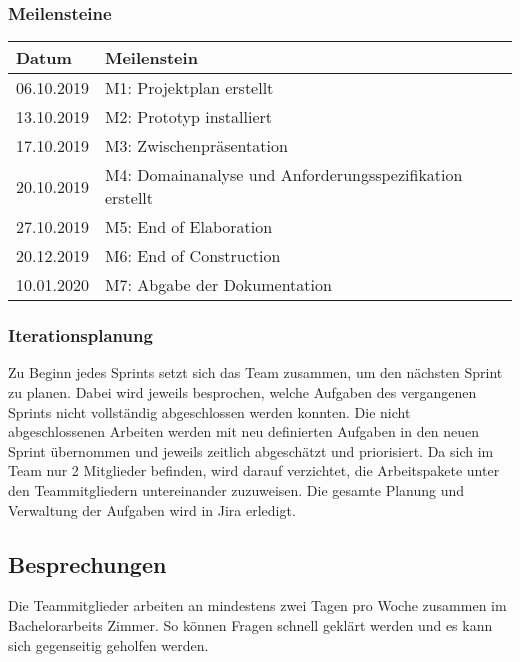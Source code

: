 \subsubsection{Meilensteine}
\begin{center}
	\begin{tabular}{| m{3cm} | m{9cm}|}
	\hline
	\textbf{Datum} & \textbf{Meilenstein} \\
	\hline
	06.10.2019 & M1: Projektplan erstellt \\
	\hline
	13.10.2019 & M2: Prototyp installiert \\
	\hline
	17.10.2019 & M3: Zwischenpräsentation \\
	\hline
	20.10.2019 & M4: Domainanalyse und Anforderungsspezifikation erstellt \\
	\hline
	27.10.2019 & M5: End of Elaboration \\
	\hline
	20.12.2019 & M6: End of Construction \\
	\hline
	10.01.2020 & M7: Abgabe der Dokumentation \\
	\hline
	\end{tabular}
\end{center}

\subsubsection{Iterationsplanung}
Zu Beginn jedes Sprints setzt sich das Team zusammen, um den nächsten Sprint zu planen. Dabei wird jeweils besprochen, welche Aufgaben des vergangenen Sprints nicht vollständig abgeschlossen werden konnten. Die nicht abgeschlossenen Arbeiten werden mit neu definierten Aufgaben in den neuen Sprint übernommen und jeweils zeitlich abgeschätzt und priorisiert. Da sich im Team nur 2 Mitglieder befinden, wird darauf verzichtet, die Arbeitspakete unter den Teammitgliedern untereinander zuzuweisen. Die gesamte Planung und Verwaltung der Aufgaben wird in Jira erledigt.

\subsection{Besprechungen}
Die Teammitglieder arbeiten an mindestens zwei Tagen pro Woche zusammen im Bachelorarbeits Zimmer. So können Fragen schnell geklärt werden und es kann sich gegenseitig geholfen werden.

\newpage